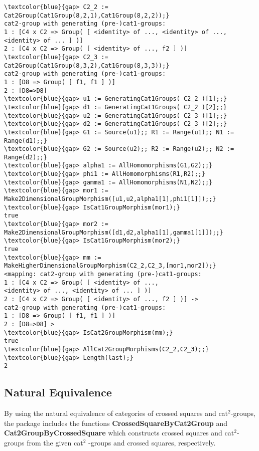 \documentclass[a4paper,11pt]{article}
\theoremstyle{plain}
\theoremstyle{definition}
\begin{document}
\begin{Verbatim}[frame=single, fontsize=\small, commandchars=\\\{\}]
\textcolor{blue}{gap> C2_2 := Cat2Group(Cat1Group(8,2,1),Cat1Group(8,2,2));}
cat2-group with generating (pre-)cat1-groups:
1 : [C4 x C2 => Group( [ <identity> of ..., <identity> of ...,
<identity> of ... ] )]
2 : [C4 x C2 => Group( [ <identity> of ..., f2 ] )]
\textcolor{blue}{gap> C2_3 := Cat2Group(Cat1Group(8,3,2),Cat1Group(8,3,3));}
cat2-group with generating (pre-)cat1-groups:
1 : [D8 => Group( [ f1, f1 ] )]
2 : [D8=>D8]
\textcolor{blue}{gap> u1 := GeneratingCat1Groups( C2_2 )[1];;}
\textcolor{blue}{gap> d1 := GeneratingCat1Groups( C2_2 )[2];;}
\textcolor{blue}{gap> u2 := GeneratingCat1Groups( C2_3 )[1];;}
\textcolor{blue}{gap> d2 := GeneratingCat1Groups( C2_3 )[2];;}
\textcolor{blue}{gap> G1 := Source(u1);; R1 := Range(u1);; N1 := Range(d1);;}
\textcolor{blue}{gap> G2 := Source(u2);; R2 := Range(u2);; N2 := Range(d2);;}
\textcolor{blue}{gap> alpha1 := AllHomomorphisms(G1,G2);;}
\textcolor{blue}{gap> phi1 := AllHomomorphisms(R1,R2);;}
\textcolor{blue}{gap> gamma1 := AllHomomorphisms(N1,N2);;}
\textcolor{blue}{gap> mor1 := Make2DimensionalGroupMorphism([u1,u2,alpha1[1],phi1[1]]);;}
\textcolor{blue}{gap> IsCat1GroupMorphism(mor1);}
true
\textcolor{blue}{gap> mor2 := Make2DimensionalGroupMorphism([d1,d2,alpha1[1],gamma1[1]]);;}
\textcolor{blue}{gap> IsCat1GroupMorphism(mor2);}
true
\textcolor{blue}{gap> mm := MakeHigherDimensionalGroupMorphism(C2_2,C2_3,[mor1,mor2]);}
<mapping: cat2-group with generating (pre-)cat1-groups:
1 : [C4 x C2 => Group( [ <identity> of ...,
<identity> of ..., <identity> of ... ] )]
2 : [C4 x C2 => Group( [ <identity> of ..., f2 ] )] ->
cat2-group with generating (pre-)cat1-groups:
1 : [D8 => Group( [ f1, f1 ] )]
2 : [D8=>D8] >
\textcolor{blue}{gap> IsCat2GroupMorphism(mm);}
true
\textcolor{blue}{gap> AllCat2GroupMorphisms(C2_2,C2_3);;}
\textcolor{blue}{gap> Length(last);}
2
\end{Verbatim}

\subsection{Natural Equivalence}

By using the natural equivalence of categories of crossed squares and cat$%
^{2}$-groups, the package includes the functions \textbf{%
	CrossedSquareByCat2Group} and \textbf{Cat2GroupByCrossedSquare} which
constructs crossed squares and cat$^{2}$-groups from the given cat$^{2}$%
-groups and crossed squares, respectively.
\end{document}

